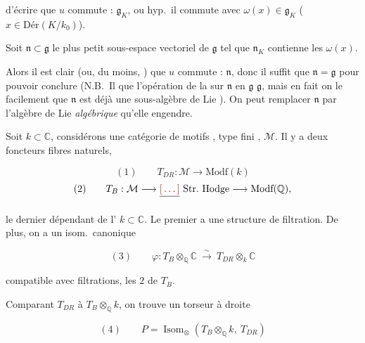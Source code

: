 \documentclass[11pt,a4paper]{article}
\begin{document}

d'écrire que $u$ commute : $\mathfrak{g}_{K}$, ou \ill{} hyp.\ il commute avec
$\omega(x) \in \mathfrak{g}_{K}$ ($x \in \text{Dér}(K/k_{0})$).

Soit $\mathfrak{n} \subset \mathfrak{g}$ le plus petit sous-espace vectoriel de
$\mathfrak{g}$ tel que $\mathfrak{n}_{K}$ contienne les $\omega(x)$.


Alors il est clair (ou, du moins, \ill{}) que \struck{\ill{}} $u$ commute :
$\mathfrak{n}$, donc il suffit \ill{} que $\mathfrak{n} = \mathfrak{g}$ pour
pouvoir conclure (N.B.\ Il \ill{} que l'opération de la \ill{} sur
$\mathfrak{n}$ en $\mathfrak{g}$ \ill{} $\mathfrak{g}$, mais en fait on le
\struck{\ill{}}  facilement que $\mathfrak{n}$ est déjà une
sous-algèbre de Lie \ill{}). On peut \struck{\ill{}} remplacer $\mathfrak{n}$
par l'algèbre de Lie \emph{algébrique} qu'elle engendre.



Soit $k \subset \mathbb{C}$, considérons une catégorie de motifs
\struck{\ill{}} , type fini \struck{\ill{}}, $\mathcal{M}$. Il y a
deux foncteurs fibres naturels,

\[ (1) \qquad T_{DR} : \mathcal{M} \longrightarrow \text{Modf}(k) \]
\[ (2) \qquad T_{B} : \mathcal{M} \longrightarrow \struck{\ill{}}\ \text{Str.\ Hodge} \longrightarrow \text{Modf}(\mathbb{Q}) , \]

le dernier dépendant de l' $k \subset \mathbb{C}$. Le premier a
une structure de filtration. De plus, on a un isom.\ canonique

\[ (3) \qquad \varphi : T_{B} \otimes_{\mathbb{Q}} \mathbb{C} \ \overset{\sim}{\longrightarrow}\ T_{DR} \otimes_{k} \mathbb{C} \]

compatible avec filtrations, les $2$ \struck{\ill{}} de $T_{B}$.


Comparant $T_{DR}$ à $T_{B} \otimes_{\mathbb{Q}} k$, on trouve un torseur à
droite

\[ (4) \qquad P = \operatorname{Isom}_{\otimes}(T_{B} \otimes_{\mathbb{Q}} k,\ T_{DR}) \]
\end{document}
